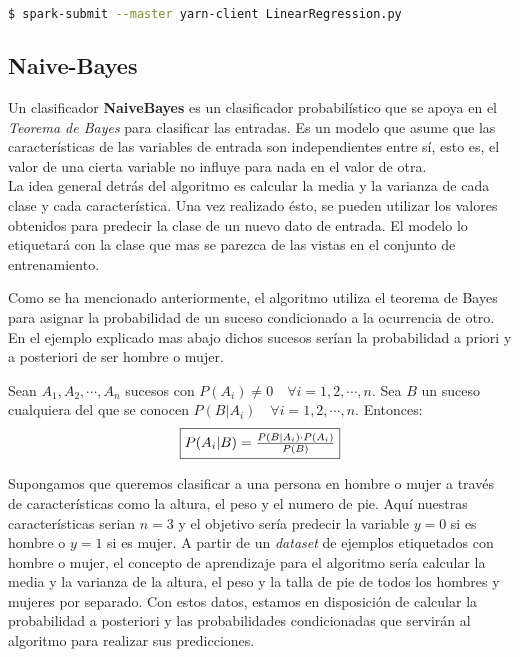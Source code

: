 \begin{lstlisting}[language=bash, numbers=none]
$ spark-submit --master yarn-client LinearRegression.py
\end{lstlisting}

\clearpage

\subsection{Naive-Bayes}
Un clasificador \textbf{NaiveBayes} es un clasificador probabilístico que se apoya en el 
\textit{Teorema de Bayes} para clasificar las entradas.
Es un modelo que asume que las características de las variables de entrada son independientes 
entre sí, esto es, el valor de una cierta variable no influye para nada en el valor de otra.\\
La idea general detrás del algoritmo es calcular la media y la varianza de cada clase y cada característica.
Una vez realizado ésto, se pueden utilizar los valores obtenidos para predecir la clase de un nuevo 
dato de entrada. El modelo lo etiquetará con la clase que mas se parezca de las vistas en el 
conjunto de entrenamiento.
\newline

Como se ha mencionado anteriormente, el algoritmo utiliza el teorema de Bayes para asignar la probabilidad de
un suceso condicionado a la ocurrencia de otro. En el ejemplo explicado mas abajo dichos sucesos serían la
probabilidad a priori y a posteriori de ser hombre o mujer.

\begin{theorem}
  Sean ${A_1, A_2, \cdots, A_n}$ sucesos con $P(A_i) \neq 0 \quad \forall i=1, 2, \cdots, n$. 
  Sea $B$ un suceso cualquiera del que se conocen $P(B|A_i) \quad \forall i=1, 2, \cdots, n$.
  Entonces:
  {\fboxsep 8pt\fboxrule 1pt
  \begin{equation*}
  \fbox{$ P(A_i|B) = \frac{P(B|A_i) \cdot P(A_i)}{P(B)} $}
  \end{equation*}
  }
\end{theorem}

Supongamos que queremos clasificar a una persona en hombre o mujer a través de características como 
la altura, el peso y el numero de pie. Aquí nuestras características serian $n=3$ y el objetivo 
sería predecir la variable $y=0$ si es hombre o $y=1$ si es mujer.
A partir de un \textit{dataset} de ejemplos etiquetados con hombre o mujer,
el concepto de aprendizaje para el algoritmo  sería calcular la media y la varianza 
de la altura, el peso y la talla de pie de todos los hombres y mujeres por separado.
Con estos datos, estamos en disposición de calcular la probabilidad a posteriori y las probabilidades 
condicionadas que servirán al algoritmo para realizar sus predicciones.

